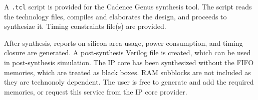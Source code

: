 %

A {\tt .tcl} script is provided for the Cadence Genus synthesis tool. The script
reads the technology files, compiles and elaborates the design, and proceeds to
synthesize it. Timing constraints file(s) are provided.

After synthesis, reports on silicon area usage, power consumption, and timing
closure are generated. A post-synthesis Verilog file is created, which can be
used in post-synthesis simulation. The IP core has been synthesized without the
FIFO memories, which are treated as black boxes. RAM subblocks are not included as
they are technonoly dependent. The user is free to generate and add the required
memories, or request this service from the IP core provider.
